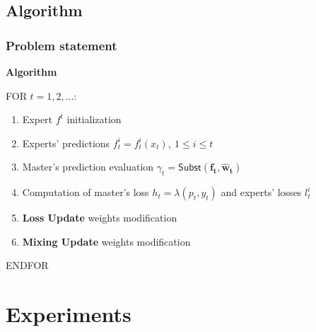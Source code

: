 \subsection{Algorithm} 
\begin{frame}
\frametitle{Problem statement}

\textbf{Algorithm}

\bigskip
%
FOR $t = 1, 2, \dots$:
\begin{enumerate}
\item Expert $f^t$ initialization
\item Experts' predictions $f_t^i = f_t^i(x_t),\ 1 \le i \le t$ 
\item Master's prediction evaluation $\gamma_t = \mathsf{Subst}(\mathbf{f_t}, \mathbf{\widehat{w}_t})$
\item Computation of master's loss $h_t = \lambda(p_t, y_t) $ and experts' losses $l_t^i$ 

\item \textbf{Loss Update} weights modification
\item \textbf{Mixing Update} weights modification

\end{enumerate}

ENDFOR

\end{frame}


\section{Experiments} 

